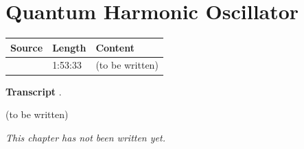 \chapter{Quantum Harmonic Oscillator}\label{ch:c37}
\begin{paracol}{2}

\begin{sources}
\begin{tabularx}{\linewidth}{@{}l l L@{}}
\toprule
\textbf{Source} & \textbf{Length} & \textbf{Content}\\
\midrule
{} & 1:53:33 & (to be written)\\
\bottomrule
\end{tabularx}

\smallskip
\textbf{Transcript} .
\end{sources}

\begin{reading}
(to be written)
\end{reading}

\emph{This chapter has not been written yet.}

\flushside
\end{paracol}
